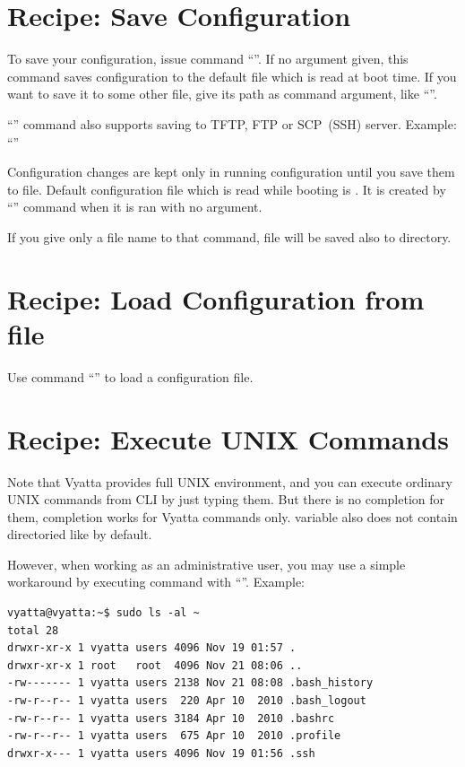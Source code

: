 \section{Recipe: Save Configuration}
\solution
To save your configuration, issue command ``''. If no argument given, this command saves configuration
to the default file which is read at boot time. If you want to save it to some other file, give its path as
command argument, like ``''.

``'' command also supports saving to TFTP, FTP or SCP~(SSH) server. Example: 
``''

\discussion
Configuration changes are kept only in running configuration until you save them to file. Default configuration
file which is read while booting  is . It is created by 
``'' command when it is ran with no argument.

If you give only a file name to that command, file will be saved also to  
directory.

\section{Recipe: Load Configuration from file}
\solution
Use command ``'' to load a configuration file.

\section{Recipe: Execute UNIX Commands}
\solution
Note that Vyatta provides full UNIX environment, and you can execute ordinary UNIX commands from CLI by just typing
them. But there is no completion for them, completion works for Vyatta commands only. 
 variable also does not contain directoried like  by default.

However, when working as an administrative user, you may use a simple workaround by executing command with
``''. Example:
\begin{verbatim}
vyatta@vyatta:~$ sudo ls -al ~
total 28
drwxr-xr-x 1 vyatta users 4096 Nov 19 01:57 .
drwxr-xr-x 1 root   root  4096 Nov 21 08:06 ..
-rw------- 1 vyatta users 2138 Nov 21 08:08 .bash_history
-rw-r--r-- 1 vyatta users  220 Apr 10  2010 .bash_logout
-rw-r--r-- 1 vyatta users 3184 Apr 10  2010 .bashrc
-rw-r--r-- 1 vyatta users  675 Apr 10  2010 .profile
drwxr-x--- 1 vyatta users 4096 Nov 19 01:56 .ssh
\end{verbatim}


